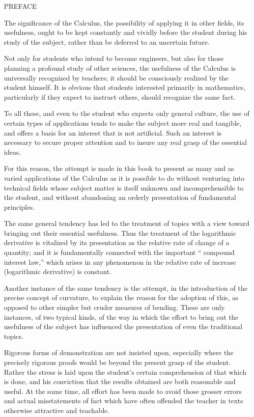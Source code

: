 \documentclass[12pt]{article}
\begin{document}
\begin{center}
PREFACE
\end{center}

The significance of the Calculus, the possibility of applying
it in other fields, its usefulness, ought to be kept constantly
and vividly before the student during his study of the subject,
rather than be deferred to an uncertain future.

Not only for students who intend to become engineers, but
also for those planning a profound study of other sciences, the
usefulness of the Calculus is universally recognized by teachers;
it should be consciously realized by the student himself. It is
obvious that students interested primarily in mathematics,
particularly if they expect to instruct others, should recognize
the same fact.

To all these, and even to the student who expects only general 
culture, the use of certain types of applications tends to
make the subject more real and tangible, and offers a basis for
an interest that is not artificial. Such an interest is necessary
to secure proper attention and to insure any real grasp of the
essential ideas.

For this reason, the attempt is made in this book to present
as many and as varied applications of the Calculus as it is
possible to do without venturing into technical fields whose
subject matter is itself unknown and incomprehensible to the
student, and without abandoning an orderly presentation of
fundamental principles.

The same general tendency has led to the treatment of
topics with a view toward bringing out their essential usefulness. 
Thus the treatment of the logarithmic derivative is
vitalized by its presentation as the relative rate of change of a
quantity; and it is fundamentally connected with the important
`` compound interest law,'' which arises in any phenomenon in
the relative rate of increase (logarithmic derivative) is
constant.

Another instance of the same tendency is the attempt, in the
introduction of the precise concept of curvature, to explain the
reason for the adoption of this, as opposed to other simpler
but cruder measures of bending. These are only instances, of
two typical kinds, of the way in which the effort to bring out
the usefulness of the subject has influenced the presentation of
even the traditional topics.

Rigorous forms of demonstration are not insisted upon, especially 
where the precisely rigorous proofs would be beyond
the present grasp of the student. Rather the stress is laid upon
the student's certain comprehension of that which is done, and
his conviction that the results obtained are both reasonable and
useful. At the same time, all effort has been made to avoid
those grosser errors and actual misstatements of fact which
have often offended the teacher in texts otherwise attractive
and teachable.
\end{document}

